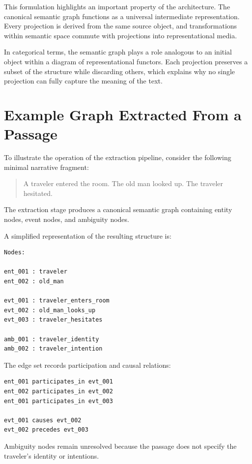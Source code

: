 \documentclass[12pt, a4paper]{article}
\begin{document}
This formulation highlights an important property of the architecture. The canonical semantic graph functions as a universal intermediate representation. Every projection is derived from the same source object, and transformations within semantic space commute with projections into representational media.

In categorical terms, the semantic graph plays a role analogous to an initial object within a diagram of representational functors. Each projection preserves a subset of the structure while discarding others, which explains why no single projection can fully capture the meaning of the text.

\section{Example Graph Extracted From a Passage}

To illustrate the operation of the extraction pipeline, consider the following minimal narrative fragment:

\begin{quote}
A traveler entered the room.  
The old man looked up.  
The traveler hesitated.
\end{quote}

The extraction stage produces a canonical semantic graph containing entity nodes, event nodes, and ambiguity nodes.

A simplified representation of the resulting structure is:

\begin{verbatim}
Nodes:

ent_001 : traveler
ent_002 : old_man

evt_001 : traveler_enters_room
evt_002 : old_man_looks_up
evt_003 : traveler_hesitates

amb_001 : traveler_identity
amb_002 : traveler_intention
\end{verbatim}

The edge set records participation and causal relations:

\begin{verbatim}
ent_001 participates_in evt_001
ent_002 participates_in evt_002
ent_001 participates_in evt_003

evt_001 causes evt_002
evt_002 precedes evt_003
\end{verbatim}

Ambiguity nodes remain unresolved because the passage does not specify the traveler’s identity or intentions.
\end{document}
